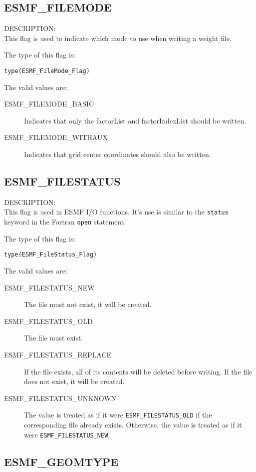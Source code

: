 \subsection{ESMF\_FILEMODE}
\label{const:filemodeflag}
{\sf DESCRIPTION:\\}
This flag is used to indicate which mode to use when writing a weight file.

The type of this flag is:

{\tt type(ESMF\_FileMode\_Flag)}

The valid values are:
\begin{description}
\item [ESMF\_FILEMODE\_BASIC]
      Indicates that only the factorList and factorIndexList should be written.
\item [ESMF\_FILEMODE\_WITHAUX]
      Indicates that grid center coordinates should also be written.

\end{description}

\subsection{ESMF\_FILESTATUS}
\label{const:filestatusflag}
{\sf DESCRIPTION:\\}
This flag is used in ESMF I/O functions. It's use is similar to the
{\tt status} keyword in the Fortran {\tt open} statement.

The type of this flag is:

{\tt type(ESMF\_FileStatus\_Flag)}

The valid values are:
\begin{description}
\item [ESMF\_FILESTATUS\_NEW]
      The file must not exist, it will be created.
\item [ESMF\_FILESTATUS\_OLD]
      The file must exist.
\item [ESMF\_FILESTATUS\_REPLACE]
      If the file exists, all of its contents will be deleted before writing.
      If the file does not exist, it will be created.
\item [ESMF\_FILESTATUS\_UNKNOWN]
      The value is treated as if it were {\tt ESMF\_FILESTATUS\_OLD} if
      the corresponding file already exists. Otherwise, the value is
      treated as if it were {\tt ESMF\_FILESTATUS\_NEW}.

\end{description}

\subsection{ESMF\_GEOMTYPE}
\label{const:geomtype}

